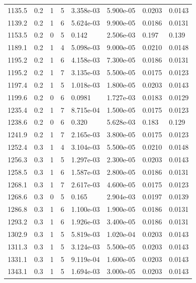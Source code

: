 \documentclass[preview]{standalone}
\begin{document}
{{{\begin{tabular}{L{1.2cm}C{1.2cm} C{0.3cm}C{0.5cm} C{1.4cm}C{1.4cm} C{1.4cm}C{1.4cm}}
  1135.5  &   0.2  & 1     &  5 &  3.358e-03  & 5.900e-05  & 0.0203 &  0.0143   \\ 
  1139.2  &   0.2  & 1     &  6 &  5.624e-03  & 9.900e-05  & 0.0186 &  0.0131   \\ 
  1153.5  &   0.2  & 0     &  5 &  0.142  & 2.506e-03  & 0.197 &  0.139   \\ 
  1189.1  &   0.2  & 1     &  4 &  5.098e-03  & 9.000e-05  & 0.0210 &  0.0148   \\ 
  1195.2  &   0.2  & 1     &  6 &  4.158e-03  & 7.300e-05  & 0.0186 &  0.0131   \\ 
  1195.2  &   0.2  & 1     &  7 &  3.135e-03  & 5.500e-05  & 0.0175 &  0.0123   \\ 
  1197.4  &   0.2  & 1     &  5 &  1.018e-03  & 1.800e-05  & 0.0203 &  0.0143   \\ 
  1199.6  &   0.2  & 0     &  6 &  0.0981  & 1.727e-03  & 0.0183 &  0.0129   \\ 
  1235.4  &   0.2  & 1     &  7 &  8.715e-04  & 1.500e-05  & 0.0175 &  0.0123   \\ 
  1238.6  &   0.2  & 0     &  6 &  0.320  & 5.628e-03  & 0.183 &  0.129   \\ 
  1241.9  &   0.2  & 1     &  7 &  2.165e-03  & 3.800e-05  & 0.0175 &  0.0123   \\ 
  1252.4  &   0.3  & 1     &  4 &  3.104e-03  & 5.500e-05  & 0.0210 &  0.0148   \\ 
  1256.3  &   0.3  & 1     &  5 &  1.297e-03  & 2.300e-05  & 0.0203 &  0.0143   \\ 
  1258.5  &   0.3  & 1     &  6 &  1.587e-03  & 2.800e-05  & 0.0186 &  0.0131   \\ 
  1268.1  &   0.3  & 1     &  7 &  2.617e-03  & 4.600e-05  & 0.0175 &  0.0123   \\ 
  1268.6  &   0.3  & 0     &  5 &  0.165  & 2.904e-03  & 0.0197 &  0.0139   \\ 
  1286.8  &   0.3  & 1     &  6 &  1.100e-03  & 1.900e-05  & 0.0186 &  0.0131   \\ 
  1293.2  &   0.3  & 1     &  6 &  1.926e-03  & 3.400e-05  & 0.0186 &  0.0131   \\ 
  1302.9  &   0.3  & 1     &  5 &  5.819e-03  & 1.020e-04  & 0.0203 &  0.0143   \\ 
  1311.3  &   0.3  & 1     &  5 &  3.124e-03  & 5.500e-05  & 0.0203 &  0.0143   \\ 
  1331.1  &   0.3  & 1     &  5 &  9.119e-04  & 1.600e-05  & 0.0203 &  0.0143   \\ 
  1343.1  &   0.3  & 1     &  5 &  1.694e-03  & 3.000e-05  & 0.0203 &  0.0143   \\ 

\end{tabular}}}}
\end{document}
